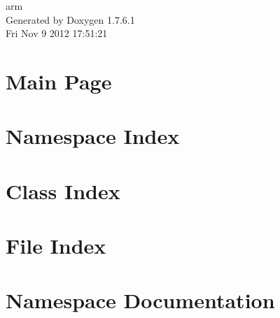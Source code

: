 \documentclass[a4paper]{book}
\begin{document}
\begin{titlepage}
\vspace*{7cm}
\begin{center}
{\Large arm }\\
\vspace*{1cm}
{\large \-Generated by Doxygen 1.7.6.1}\\
\vspace*{0.5cm}
{\small Fri Nov 9 2012 17:51:21}\\
\end{center}
\end{titlepage}
\clearemptydoublepage
{}
\tableofcontents
\clearemptydoublepage
{}
\chapter{\-Main \-Page}
\label{index}
\chapter{\-Namespace \-Index}

\chapter{\-Class \-Index}

\chapter{\-File \-Index}

\chapter{\-Namespace \-Documentation}










\end{document}
